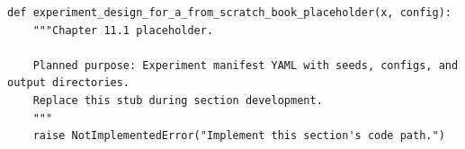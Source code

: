 \begin{lstlisting}[style=bookpython,caption={Planned code placeholder for experiment design for a from scratch book.},label={lst:ch11-experiment-design-for-a-from-scratch-book}]
def experiment_design_for_a_from_scratch_book_placeholder(x, config):
    """Chapter 11.1 placeholder.

    Planned purpose: Experiment manifest YAML with seeds, configs, and output directories.
    Replace this stub during section development.
    """
    raise NotImplementedError("Implement this section's code path.")
\end{lstlisting}
